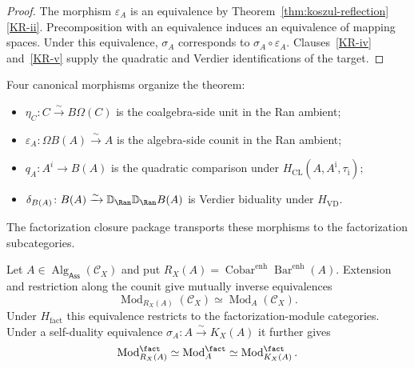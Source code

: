 \begin{proof}
The morphism $\varepsilon_A$ is an equivalence by
Theorem~\ref{thm:koszul-reflection}\ref{KR-ii}.  Precomposition with
an equivalence induces an equivalence of mapping spaces.  Under this
equivalence, $\sigma_A$ corresponds to
$\sigma_A\circ\varepsilon_A$.  Clauses~\ref{KR-iv} and~\ref{KR-v}
supply the quadratic and Verdier identifications of the target.
\end{proof}

\begin{remark}
\label{rem:four-named-morphisms}
Four canonical morphisms organize the theorem:
\begin{itemize}
\item $\eta_C\colon C\xrightarrow{\sim}B\Omega(C)$ is the
coalgebra-side unit in the Ran ambient;
\item $\varepsilon_A\colon\Omega B(A)\xrightarrow{\sim}A$ is the
algebra-side counit in the Ran ambient;
\item $q_A\colon A^i\to B(A)$ is the quadratic comparison under
$H_{\mathrm{CL}}(A,A^{\mathrm i},\tau_{\mathrm i})$;
\item $\delta_{B(A)}\colon
B(A)\xrightarrow{\sim}\mathbb D_{\Ran}\mathbb D_{\Ran}B(A)$ is
Verdier biduality under $H_{\mathrm{VD}}$.
\end{itemize}
The factorization closure package transports these morphisms to the
factorization subcategories.
\end{remark}

\begin{proposition}
\label{prop:A-module-completion-firewall}
Let $A\in\operatorname{Alg}_{\mathsf{Ass}}(\mathcal C_X)$ and put
$R_X(A)=\operatorname{Cobar}^{\mathrm{enh}}
\operatorname{Bar}^{\mathrm{enh}}(A)$.  Extension and restriction
along the counit give mutually inverse equivalences
\[
\operatorname{Mod}_{R_X(A)}(\mathcal C_X)
\simeq
\operatorname{Mod}_{A}(\mathcal C_X).
\]
Under $H_{\mathrm{fact}}$ this equivalence restricts to the
factorization-module categories.  Under a self-duality equivalence
$\sigma_A\colon A\xrightarrow{\sim}K_X(A)$ it further gives
\[
\operatorname{Mod}_{R_X(A)}^{\fact}
\simeq
\operatorname{Mod}_{A}^{\fact}
\simeq
\operatorname{Mod}_{K_X(A)}^{\fact}.
\]
\end{proposition}

